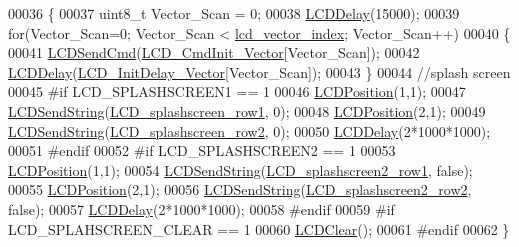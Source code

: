 \begin{DoxyCode}
00036 \{
00037     uint8\_t Vector\_Scan = 0;
00038     \hyperlink{group__lcd__h_gabba7f6ce117ebde044aefb40b6ec8dc1}{LCDDelay}(15000);
00039     \textcolor{keywordflow}{for}(Vector\_Scan=0; Vector\_Scan < \hyperlink{group__lcd__h_ga5b5f7e083c03030e46ef30ba2f9a4807}{lcd\_vector\_index}; Vector\_Scan++)
00040     \{
00041         \hyperlink{group__lcd__h_gadf46506fd9d8c431334544aa11f4758d}{LCDSendCmd}(\hyperlink{group__lcd__h_gaf29aec3c2f771e62d84392f6d3fa1427}{LCD\_CmdInit\_Vector}[Vector\_Scan]);
00042         \hyperlink{group__lcd__h_gabba7f6ce117ebde044aefb40b6ec8dc1}{LCDDelay}(\hyperlink{group__lcd__h_gaa94f066be94d030edb2bd88f7bd2b804}{LCD\_InitDelay\_Vector}[Vector\_Scan]);
00043     \}
00044     \textcolor{comment}{//splash screen}
00045 \textcolor{preprocessor}{#if LCD\_SPLASHSCREEN1 == 1}
00046 \textcolor{preprocessor}{}    \hyperlink{group__lcd__h_gad4c66b9810c1c89a670b7c619a727cae}{LCDPosition}(1,1);
00047     \hyperlink{group__lcd__h_ga235609b6036ae1c877c66c70c9e1b962}{LCDSendString}(\hyperlink{group__lcd__h_ga251cf3018caf604ae46e1636e2678cda}{LCD\_splashscreen\_row1}, 0);
00048     \hyperlink{group__lcd__h_gad4c66b9810c1c89a670b7c619a727cae}{LCDPosition}(2,1);
00049     \hyperlink{group__lcd__h_ga235609b6036ae1c877c66c70c9e1b962}{LCDSendString}(\hyperlink{group__lcd__h_ga2f0e22d3d76e41b82bc3c55c1564143c}{LCD\_splashscreen\_row2}, 0);
00050     \hyperlink{group__lcd__h_gabba7f6ce117ebde044aefb40b6ec8dc1}{LCDDelay}(2*1000*1000);
00051 \textcolor{preprocessor}{#endif}
00052 \textcolor{preprocessor}{}\textcolor{preprocessor}{#if LCD\_SPLASHSCREEN2 == 1}
00053 \textcolor{preprocessor}{}    \hyperlink{group__lcd__h_gad4c66b9810c1c89a670b7c619a727cae}{LCDPosition}(1,1);
00054     \hyperlink{group__lcd__h_ga235609b6036ae1c877c66c70c9e1b962}{LCDSendString}(\hyperlink{group__lcd__h_gac7bb85d0a6249381b2d7050da3e2e99c}{LCD\_splashscreen2\_row1}, \textcolor{keyword}{false});
00055     \hyperlink{group__lcd__h_gad4c66b9810c1c89a670b7c619a727cae}{LCDPosition}(2,1);
00056     \hyperlink{group__lcd__h_ga235609b6036ae1c877c66c70c9e1b962}{LCDSendString}(\hyperlink{group__lcd__h_ga5c961ed231f58622f0d35f1f29439bbd}{LCD\_splashscreen2\_row2}, \textcolor{keyword}{false});
00057     \hyperlink{group__lcd__h_gabba7f6ce117ebde044aefb40b6ec8dc1}{LCDDelay}(2*1000*1000);
00058 \textcolor{preprocessor}{#endif}
00059 \textcolor{preprocessor}{}\textcolor{preprocessor}{#if LCD\_SPLAHSCREEN\_CLEAR == 1}
00060 \textcolor{preprocessor}{}    \hyperlink{group__lcd__h_ga3a94c0f44f76db891e66d98966f904e8}{LCDClear}();
00061 \textcolor{preprocessor}{#endif}
00062 \textcolor{preprocessor}{}\}
\end{DoxyCode}

